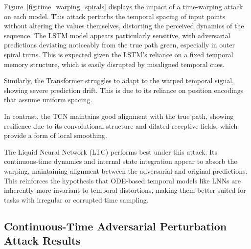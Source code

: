 Figure~\ref{fig:time_warping_spirals} displays the impact of a time-warping attack on each model. This attack perturbs the temporal spacing of input points without altering the values themselves, distorting the perceived dynamics of the sequence. The LSTM model appears particularly sensitive, with adversarial predictions deviating noticeably from the true path green, especially in outer spiral turns. This is expected given the LSTM's reliance on a fixed temporal memory structure, which is easily disrupted by misaligned temporal cues.

Similarly, the Transformer struggles to adapt to the warped temporal signal, showing severe prediction drift. This is due to its reliance on position encodings that assume uniform spacing.

In contrast, the TCN maintains good alignment with the true path, showing resilience due to its convolutional structure and dilated receptive fields, which provide a form of local smoothing.

The Liquid Neural Network (LTC) performs best under this attack. Its continuous-time dynamics and internal state integration appear to absorb the warping, maintaining alignment between the adversarial and original predictions. This reinforces the hypothesis that ODE-based temporal models like LNNs are inherently more invariant to temporal distortions, making them better suited for tasks with irregular or corrupted time sampling.

\subsection*{Continuous-Time Adversarial Perturbation Attack Results}

